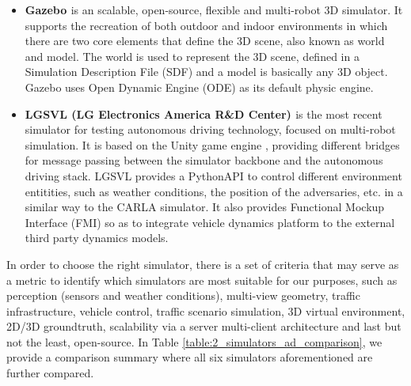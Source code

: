 \begin{itemize}
	\item \textbf{Gazebo \cite{koenig2004design}} is an scalable, open-source, flexible and multi-robot 3D simulator. It supports the recreation of both outdoor and indoor environments in which there are two core elements that define the 3D scene, also known as world and model. The world is used to represent the 3D scene, defined in a Simulation Description File (SDF) and a model is basically any 3D object. Gazebo uses Open Dynamic Engine (ODE) as its default physic engine.
	
	\item \textbf{LGSVL (LG Electronics America R\&D Center) \cite{rong2020lgsvl}} is the most recent simulator for testing autonomous driving technology, focused on multi-robot simulation. It is based on the Unity game engine \cite{haas2014history}, providing different bridges for message passing between the simulator backbone and the autonomous driving stack. LGSVL provides a PythonAPI to control different environment entitities, such as weather conditions, the position of the adversaries, etc. in a similar way to the CARLA simulator. It also provides Functional Mockup Interface (FMI) so as to integrate vehicle dynamics platform to the external third party dynamics models.
	
\end{itemize}

In order to choose the right simulator, there is a set of criteria \cite{kaur2021survey} that may serve as a metric to identify which simulators are most suitable for our purposes, such as perception (sensors and weather conditions), multi-view geometry, traffic infrastructure, vehicle control, traffic scenario simulation, 3D virtual environment, 2D/3D groundtruth, scalability via a server multi-client architecture and last but not the least, open-source. In Table \ref{table:2_simulators_ad_comparison}, we provide a comparison summary where all six simulators aforementioned are further compared.

